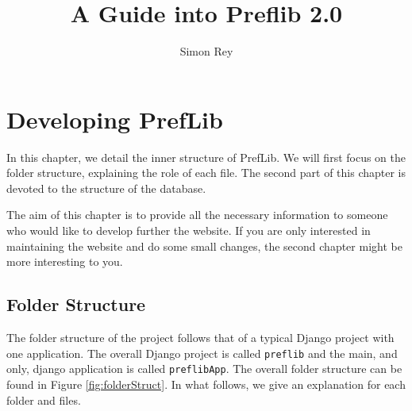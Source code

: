\documentclass{report}
\begin{document}
	\title{A Guide into Preflib 2.0}
	\author{Simon Rey}
	\maketitle
	
	\tableofcontents
	
	\chapter{Developing PrefLib}
	
	In this chapter, we detail the inner structure of PrefLib. We will first focus on the folder structure, explaining the role of each file. The second part of this chapter is devoted to the structure of the database. 
	
	The aim of this chapter is to provide all the necessary information to someone who would like to develop further the website. If you are only interested in maintaining the website and do some small changes, the second chapter might be more interesting to you.
	
	\section{Folder Structure}
	
	The folder structure of the project follows that of a typical Django project with one application. The overall Django project is called \texttt{preflib} and the main, and only, django application is called \texttt{preflibApp}. The overall folder structure can be found in Figure \ref{fig:folderStruct}. In what follows, we give an explanation for each folder and files.
	
\end{document}
